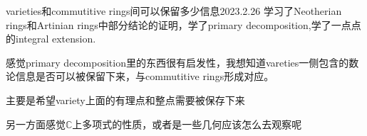 \begin{diary}{varieties和commutitive rings间可以保留多少信息}{2023.2.26}
学习了Neotherian rings和Artinian rings中部分结论的证明，学了primary decomposition,学了一点点的integral extension.

感觉primary decomposition里的东西很有启发性，我想知道vareties一侧包含的数论信息是否可以被保留下来，与commutitive rings形成对应。

主要是希望variety上面的有理点和整点需要被保存下来

另一方面感觉$\mathbb{C}$上多项式的性质，或者是一些几何应该怎么去观察呢
\end{diary}